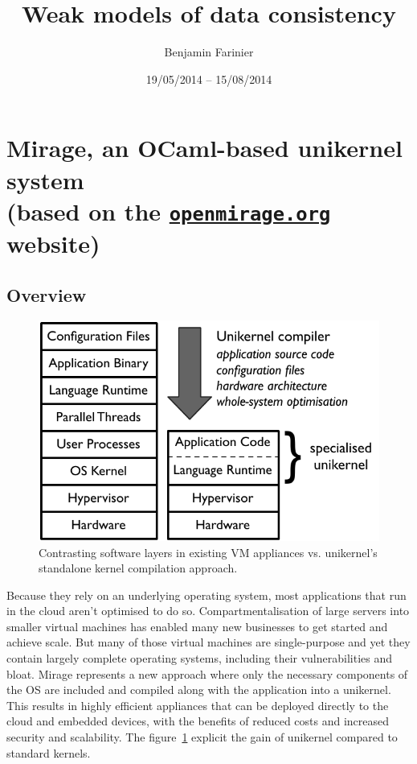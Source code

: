 \documentclass{article}
\title{Weak models of data consistency}
\author{Benjamin Farinier}
\date{19/05/2014 -- 15/08/2014}
\renewcommand{\-}{\hyp}
\newcommand{\mirage}{Mirage\xspace}
\newcommand{\ocaml}{OCaml\xspace}
\begin{document}
\maketitle
\tableofcontents

\section[\mirage, an \ocaml-based unikernel system]{\mirage, an \ocaml-based unikernel system\\\normalsize\normalfont(based on the \href{http://openmirage.org}{\texttt{openmirage.org}} website)}

\subsection{Overview}

\begin{figure}
\centering
\includegraphics[scale=0.8]{mirage-stack.pdf}
\caption{Contrasting software layers in existing VM appliances vs.
unikernel’s standalone kernel compilation approach.}
\label{mirage-stack}
\end{figure}

Because they rely on an underlying operating system, most applications that run in the cloud aren't optimised to do so.
Compartmentalisation of large servers into smaller virtual machines has enabled many new businesses to get started and achieve scale.
But many of those virtual machines are single-purpose and yet they contain largely complete operating systems, including their vulnerabilities and bloat.
\mirage represents a new approach where only the necessary components of the OS are included and compiled along with the application into a unikernel.
This results in highly efficient appliances that can be deployed directly to the cloud and embedded devices, with the benefits of reduced costs and increased security and scalability. The figure~\ref{mirage-stack} explicit the gain of unikernel compared to standard kernels.
\end{document}
